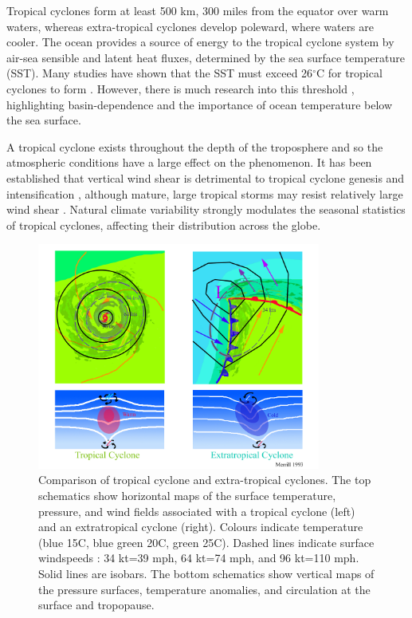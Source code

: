 Tropical cyclones form at least 500 km, 300 miles from the equator \citep{noaaA15} over warm waters, whereas extra-tropical cyclones develop poleward, where waters are cooler. The ocean provides a source of energy to the tropical cyclone system by air-sea sensible and latent heat fluxes, determined by the sea surface temperature (SST). Many studies have shown that the SST must exceed 26$^{\circ}$C for tropical cyclones to form \citep[e.g.][]{palmen1948formation}. However, there is much research into this threshold \citep[e.g.][]{dare2011threshold, mctaggart2015revisiting}, highlighting basin-dependence and the importance of ocean temperature below the sea surface. 

A tropical cyclone exists throughout the depth of the troposphere and so the atmospheric conditions have a large effect on the phenomenon. It has been established that vertical wind shear is detrimental to tropical cyclone genesis and intensification \citep[e.g.][]{chan1982tropical, McBride1995}, although mature, large tropical storms may resist relatively large wind shear \citep{zeng2007environmental}. Natural climate variability strongly modulates the seasonal statistics of tropical cyclones, affecting their distribution across the globe.


\begin{figure}[h]
	\centering
	\noindent\includegraphics[width=22pc,angle=0]{trop-extra.jpg}
	\caption{Comparison of tropical cyclone and extra-tropical cyclones. The top schematics show horizontal maps of the surface temperature, pressure, and wind fields associated with a tropical cyclone (left) and an extratropical cyclone (right). Colours indicate temperature (blue 15C, blue green 20C, green 25C). Dashed lines indicate surface windspeeds : 34 kt=39 mph, 64 kt=74 mph, and 96 kt=110 mph. Solid lines are isobars. The bottom schematics show vertical maps of the pressure surfaces, temperature anomalies, and circulation at the surface and tropopause. \cite{NOAA}}\label{fig:trop-extra} %
\end{figure}

